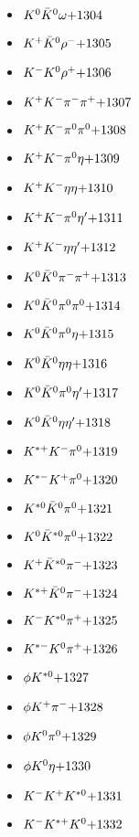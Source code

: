 \begin{multicols}{3}
\begin{itemize}
 \item $ K^{0} \bar{K}^{0} \omega \hfill{+1304}$
 \item $ K^{+} \bar{K}^{0} \rho^{-} \hfill{+1305}$
 \item $ K^{-} K^{0} \rho^{+} \hfill{+1306}$
 \item $ K^{+} K^{-} \pi^{-} \pi^{+} \hfill{+1307}$
 \item $ K^{+} K^{-} \pi^{0} \pi^{0} \hfill{+1308}$
 \item $ K^{+} K^{-} \pi^{0} \eta \hfill{+1309}$
 \item $ K^{+} K^{-} \eta \eta \hfill{+1310}$
 \item $ K^{+} K^{-} \pi^{0} {\eta^{\prime}} \hfill{+1311}$
 \item $ K^{+} K^{-} \eta {\eta^{\prime}} \hfill{+1312}$
 \item $ K^{0} \bar{K}^{0} \pi^{-} \pi^{+} \hfill{+1313}$
 \item $ K^{0} \bar{K}^{0} \pi^{0} \pi^{0} \hfill{+1314}$
 \item $ K^{0} \bar{K}^{0} \pi^{0} \eta \hfill{+1315}$
 \item $ K^{0} \bar{K}^{0} \eta \eta \hfill{+1316}$
 \item $ K^{0} \bar{K}^{0} \pi^{0} {\eta^{\prime}} \hfill{+1317}$
 \item $ K^{0} \bar{K}^{0} \eta {\eta^{\prime}} \hfill{+1318}$
 \item $ K^{*+} K^{-} \pi^{0} \hfill{+1319}$
 \item $ K^{*-} K^{+} \pi^{0} \hfill{+1320}$
 \item $ K^{*0} \bar{K}^{0} \pi^{0} \hfill{+1321}$
 \item $ K^{0} \bar{K}^{*0} \pi^{0} \hfill{+1322}$
 \item $ K^{+} \bar{K}^{*0} \pi^{-} \hfill{+1323}$
 \item $ K^{*+} \bar{K}^{0} \pi^{-} \hfill{+1324}$
 \item $ K^{-} K^{*0} \pi^{+} \hfill{+1325}$
 \item $ K^{*-} K^{0} \pi^{+} \hfill{+1326}$
 \item $ \phi K^{*0} \hfill{+1327}$
 \item $ \phi K^{+} \pi^{-} \hfill{+1328}$
 \item $ \phi K^{0} \pi^{0} \hfill{+1329}$
 \item $ \phi K^{0} \eta \hfill{+1330}$
 \item $ K^{-} K^{+} K^{*0} \hfill{+1331}$
 \item $ K^{-} K^{*+} K^{0} \hfill{+1332}$

\end{itemize}
\end{multicols}

